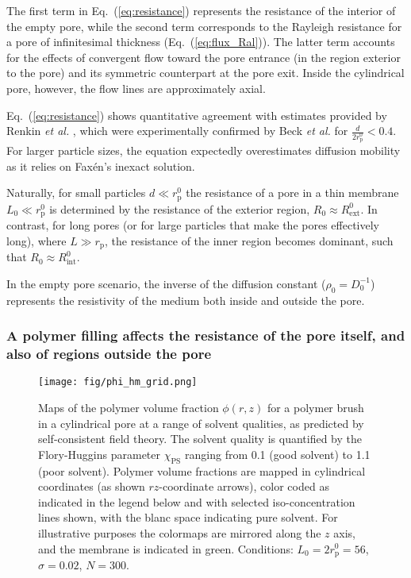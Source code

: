 \documentclass[12pt, a4paper]{article}
\begin{document}
The first term in Eq.~(\ref{eq:resistance}) represents the resistance of the interior of the empty pore, while the second term corresponds to the Rayleigh resistance for a pore of infinitesimal thickness (Eq.~(\ref{eq:flux_Ral})). The latter term accounts for the effects of convergent flow toward the pore entrance (in the region exterior to the pore) and its symmetric counterpart at the pore exit. Inside the cylindrical pore, however, the flow lines are approximately axial.

Eq.~(\ref{eq:resistance}) shows quantitative agreement with estimates provided by Renkin \emph{et al.} \cite{Renkin1954}, which were experimentally confirmed by Beck \emph{et al.} \cite{Beck1970} for $\frac{d}{2 r_{\text{p}}^{0}} < 0.4$. For larger particle sizes, the equation expectedly overestimates diffusion mobility as it relies on Fax\'en's inexact solution.

Naturally, for small particles $d \ll r_{\text{p}}^{0}$ the resistance of a pore in a thin membrane $L_{0} \ll r_{\text{p}}^{0}$ is determined by the resistance of the exterior region, $R_{0} \approx R_{\text{ext}}^{0}$.
In contrast, for long pores (or for large particles that make the pores effectively long), where $L \gg r_{\text{p}}$, the resistance of the inner region becomes dominant, such that $R_{0} \approx R_{\text{int}}^{0}$.


In the empty pore scenario, the inverse of the diffusion constant ($\rho_0=D_0^{-1}$) represents the resistivity of the medium both inside and outside the pore. 

\subsubsection{A polymer filling affects the resistance of the pore itself, and also of regions outside the pore}

\begin{figure}
    \centering
    \texttt{[image: fig/phi\_hm\_grid.png]}
    \caption{
    Maps of the polymer volume fraction $\phi(r,z)$ for a polymer brush in a cylindrical pore at a range of solvent qualities, as predicted by self-consistent field theory. 
    The solvent quality is quantified by the Flory-Huggins parameter $\chi_{\text{PS}}$ ranging from 0.1 (good solvent) to 1.1 (poor solvent).
    Polymer volume fractions are mapped in cylindrical coordinates (as shown $rz$-coordinate arrows), color coded as indicated in the legend below and with selected iso-concentration lines shown, with the blanc space indicating pure solvent.
    For illustrative purposes the colormaps are mirrored along the $z$ axis, and the membrane is indicated in green.
    Conditions: $L_{0}=2r_{\text{p}}^{0}=56$, $\sigma=0.02$, $N=300$.
    }
    \label{fig:phi_hm_grid}
\end{figure}
\end{document}

